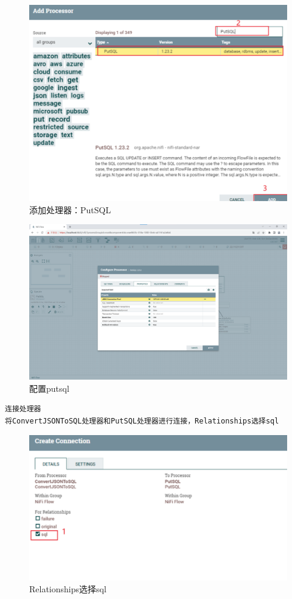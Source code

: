 \documentclass{article}
\begin{document}
\begin{enumerate}
\begin{figure}[htp]
        \includegraphics[width=13cm]{添加putsql.png}
        \caption{添加处理器：PutSQL}
        \label{pic6}
    \end{figure}
    \begin{figure}[htp]
        \centering
        \includegraphics[width=13cm]{配置putsql.png}
        \caption{配置putsql}
        \label{pic6}
    \end{figure}
    \newpage
    \begin{lstlisting}
连接处理器
将ConvertJSONToSQL处理器和PutSQL处理器进行连接，Relationships选择sql
    \end{lstlisting}
    \begin{figure}[htp]
        \centering
        \includegraphics[width=13cm]{连接3.png}
        \caption{Relationships选择sql}
        \label{pic6}
    \end{figure}
    \newpage
    

\end{enumerate}
\end{document}
